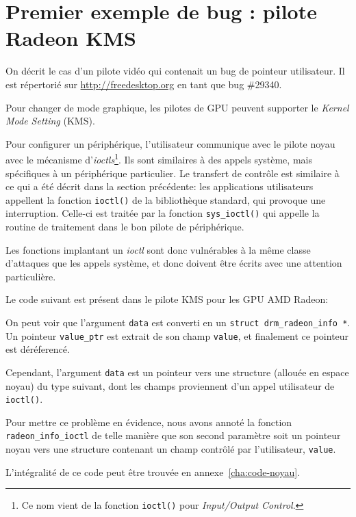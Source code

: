 \section{Premier exemple de bug : pilote Radeon KMS}

On décrit le cas d'un pilote vidéo qui contenait un bug de pointeur utilisateur.
Il est répertorié sur \url{http://freedesktop.org} en tant que bug \#29340.

Pour changer de mode graphique, les pilotes de GPU peuvent supporter le
\emph{Kernel Mode Setting} (KMS).

Pour configurer un périphérique, l'utilisateur communique avec le pilote noyau
avec le mécanisme d'\emph{ioctls}\footnote{
  Ce nom vient de la fonction \verb!ioctl()! pour
  \emph{Input/Output Control}.
}.
Ils sont similaires à des appels système, mais spécifiques à un périphérique
particulier. Le transfert de contrôle est similaire à ce qui a été décrit dans
la section précédente: les applications utilisateurs appellent la fonction
\texttt{ioctl()} de la bibliothèque standard, qui provoque une interruption.
Celle-ci est traitée par la fonction \texttt{sys\_ioctl()} qui appelle la
routine de traitement dans le bon pilote de périphérique.

Les fonctions implantant un \emph{ioctl} sont donc vulnérables à la
même classe d'attaques que les appels système, et donc doivent être écrits avec
une attention particulière.

Le code suivant est présent dans le pilote KMS pour les GPU AMD Radeon:


On peut voir que l'argument \texttt{data} est converti en un \texttt{struct
drm\_radeon\_info *}. Un pointeur \texttt{value\_ptr} est extrait de son champ
\texttt{value}, et finalement ce pointeur est déréferencé.

Cependant, l'argument \texttt{data} est un pointeur vers une structure (allouée
en espace noyau) du type suivant, dont les champs proviennent d'un appel
utilisateur de \verb!ioctl()!.


Pour mettre ce problème en évidence, nous avons annoté la fonction
\texttt{radeon\_info\_ioctl} de telle manière que son second paramètre soit un
pointeur noyau vers une structure contenant un champ contrôlé par l'utilisateur,
\texttt{value}.

L'intégralité de ce code peut être trouvée en annexe~\ref{cha:code-noyau}.

